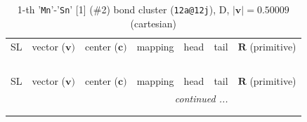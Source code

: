 \documentclass[fleqn,10pt,landscape]{jsarticle}
\begin{document}
\renewcommand{\arraystretch}{1.6}
\begin{longtable}[l]{cllllll}
\captionsetup{justification=raggedright, singlelinecheck=off}
\caption{1-th '\texttt{Mn}'-'\texttt{Sn}' [1] (\#2) bond cluster (\texttt{12a@12j}), D, $|\bm{v}|=0.50009$ (cartesian)}
 \\
 \hline \hline
SL & vector ($\bm{v})$ & center ($\bm{c})$ & mapping & head & tail & $\bm{R}$ (primitive) \\ \hline \endfirsthead

\multicolumn{6}{l}{\tablename\ \thetable{}} \\
 \hline \hline
SL & vector ($\bm{v})$ & center ($\bm{c})$ & mapping & head & tail & $\bm{R}$ (primitive) \\ \hline \endhead

 \hline \hline
\multicolumn{6}{r}{\footnotesize\it continued ...} \\ \endfoot

 \hline \hline
\multicolumn{6}{r}{} \\ \endlastfoot


\end{longtable}
\end{document}
